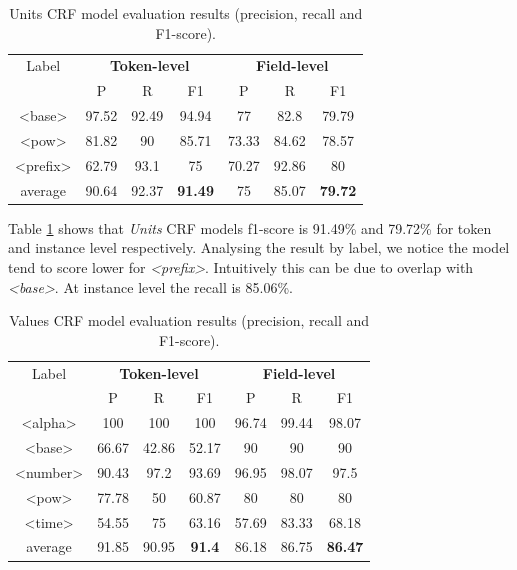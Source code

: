 \documentclass[sigconf]{acmart}
\begin{document}
\begin{table}[ht]
    \caption{Units CRF model evaluation results (precision, recall and F1-score).}
    \label{tab:units-evaluation}
    \begin{tabular}{c|ccc|ccc}
        \toprule
        Label & \multicolumn{3}{c}{\textbf{Token-level}} & \multicolumn{3}{c}{\textbf{Field-level}}\\
        & P & R & F1 & P & R & F1 \\
        \midrule
        <base>    & 97.52 & 92.49 & 94.94 & 77    & 82.8  & 79.79 \\
        <pow>     & 81.82 & 90    & 85.71 & 73.33 & 84.62 & 78.57 \\
        <prefix>  & 62.79 & 93.1  & 75    & 70.27 & 92.86 & 80    \\
        \midrule
        average   & 90.64  & 92.37 & \textbf{91.49} & 75   & 85.07 & \textbf{79.72} \\
        \bottomrule
   \end{tabular}
\end{table}

Table \ref{tab:units-evaluation} shows that \textit{Units} CRF models f1-score is 91.49\% and 79.72\% for token and instance level respectively. Analysing the result by label, we notice the model tend to score lower for \textit{<prefix>}. Intuitively this can be due to overlap with \textit{<base>}. At instance level the recall is 85.06\%. 

\begin{table}[ht]
  \caption{Values CRF model evaluation results (precision, recall and F1-score).}
  \label{tab:values-evaluation}
  \begin{tabular}{c|ccc|ccc}
    \toprule
    Label & \multicolumn{3}{c}{\textbf{Token-level}} & \multicolumn{3}{c}{\textbf{Field-level}}\\
    & P & R & F1 & P & R & F1 \\
    \midrule
    <alpha>       & 100   & 100   & 100   & 96.74 & 99.44 & 98.07   \\
    <base>        & 66.67 & 42.86 & 52.17 & 90    & 90    & 90      \\
    <number>      & 90.43 & 97.2  & 93.69 & 96.95 & 98.07 & 97.5    \\
    <pow>         & 77.78 & 50    & 60.87 & 80    & 80    & 80      \\
    <time>        & 54.55 & 75    & 63.16 & 57.69 & 83.33 & 68.18   \\
    \midrule
    average       & 91.85 & 90.95 & \textbf{91.4} & 86.18 & 86.75 & \textbf{86.47}   \\
    \bottomrule
     \end{tabular}
\end{table}
\end{document}
